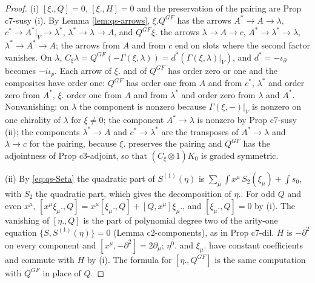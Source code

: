 \begin{proof}
(i) $[\xi.,Q]=0$, $[\xi.,H]=0$ and the preservation of the pairing are Prop c7-susy (i). By Lemma \ref{lem:qs-arrows}, $\xi.Q^{GF}$ has the arrows $A^*\to A\to\lambda$, $c^*\to A^*|_V\to\lambda^*$, $\lambda^*\to\lambda\to A$, and $Q^{GF}\xi.$ the arrows $\lambda\to A\to c$, $A^*\to\lambda^*\to\lambda$, $\lambda^*\to A^*\to A$; the arrows from $A$ and from $c$ end on slots where the second factor vanishes. On $\lambda$, $C_\xi\lambda=Q^{GF}(-\Gamma(\xi,\lambda))=d^*(\Gamma(\xi,\lambda)|_V)$, and $d^*=-\iota_\partial$ becomes $-i\iota_p$. Each arrow of $\xi.$ and of $Q^{GF}$ has order zero or one and the composites have order one: $Q^{GF}$ has order one from $A$ and from $c^*$, $\lambda^*$ and order zero from $A^*$, $\xi.$ order one from $A$ and from $\lambda^*$ and order zero from $\lambda$ and $A^*$. Nonvanishing: on $\lambda$ the component is nonzero because $\Gamma(\xi,-)|_V$ is nonzero on one chirality of $\lambda$ for $\xi\ne0$; the component $A^*\to\lambda$ is nonzero by Prop c7-susy (ii); the components $\lambda^*\to A$ and $c^*\to\lambda^*$ are the transposes of $A^*\to\lambda$ and $\lambda\to c$ for the pairing, because $\xi.$ preserves the pairing and $Q^{GF}$ has the adjointness of Prop c3-adjoint, so that $(C_\xi\otimes1)K_0$ is graded symmetric.

(ii) By \eqref{eq:qs-Seta} the quadratic part of $S^{(1)}(\eta)$ is $\sum_\mu\int x^\mu\,S_2(\xi_\mu)+\int s_0$, with $S_2$ the quadratic part, which gives the decomposition of $\eta.$. For odd $Q$ and even $x^\mu$, $[x^\mu\xi_\mu.,Q]=x^\mu[\xi_\mu.,Q]+[Q,x^\mu]\xi_\mu.$, and $[\xi_\mu.,Q]=0$ by (i). The vanishing of $[\eta.,Q]$ is the part of polynomial degree two of the arity-one equation $\{S,S^{(1)}(\eta)\}=0$ (Lemma c2-components), as in Prop c7-dil. $H$ is $-\partial^2$ on every component and $[x^\mu,-\partial^2]=2\partial_\mu$; $\eta^0.$ and $\xi_\mu.$ have constant coefficients and commute with $H$ by (i). The formula for $[\eta.,Q^{GF}]$ is the same computation with $Q^{GF}$ in place of $Q$.


\end{proof}
